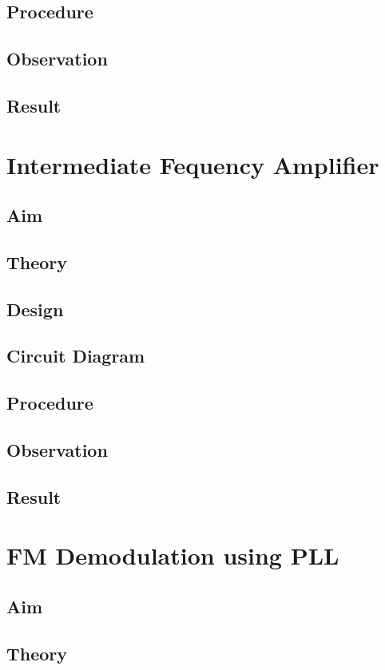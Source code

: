 \documentclass{book}
\begin{document}
\section*{Procedure}
\section*{Observation}
\section*{Result}

\chapter[Intermediate Fequency Amplifier]{Intermediate Fequency Amplifier}
\section*{Aim}
\section*{Theory}
\section*{Design}
\section*{Circuit Diagram}
\section*{Procedure}
\section*{Observation}
\section*{Result}

\chapter[FM Demodulation using PLL]{FM Demodulation using PLL}
\section*{Aim}
\section*{Theory}
\end{document}
